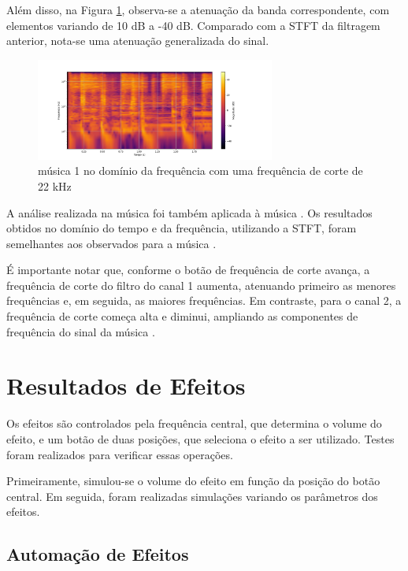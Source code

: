 Além disso, na Figura \ref{fig31}, observa-se a atenuação da banda correspondente, com elementos variando de 10 dB a -40 dB. Comparado com a STFT da filtragem anterior, nota-se uma atenuação generalizada do sinal.

\begin{figure}[h]
    \centering
    \includegraphics[width=0.7\textwidth]{figuras/fig31.png}
    \caption{música 1 no domínio da frequência com uma frequência de corte de 22 kHz}
    \label{fig31}
\end{figure}

A análise realizada na música \cite{track01} foi também aplicada à música \cite{track02}. Os resultados obtidos no domínio do tempo e da frequência, utilizando a STFT, foram semelhantes aos observados para a música \cite{track01}.

É importante notar que, conforme o botão de frequência de corte avança, a frequência de corte do filtro do canal 1 aumenta, atenuando primeiro as menores frequências e, em seguida, as maiores frequências. Em contraste, para o canal 2, a frequência de corte começa alta e diminui, ampliando as componentes de frequência do sinal da música \cite{track02}.

\newpage
\section{Resultados de Efeitos}

Os efeitos são controlados pela frequência central, que determina o volume do efeito, e um botão de duas posições, que seleciona o efeito a ser utilizado. Testes foram realizados para verificar essas operações.

Primeiramente, simulou-se o volume do efeito em função da posição do botão central. Em seguida, foram realizadas simulações variando os parâmetros dos efeitos.

\subsection{Automação de Efeitos}

